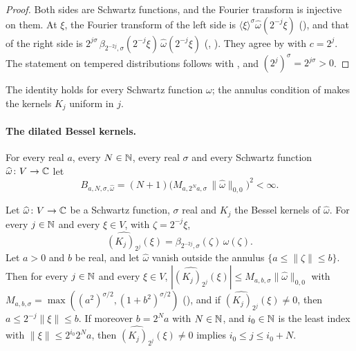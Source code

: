 \begin{proof}
\leanok
Both sides are Schwartz functions, and the Fourier transform is injective on them. At $\xi$,
the Fourier transform of the left side is $\langle \xi \rangle^\sigma \widehat\omega(2^{-j}\xi)$
(), and that of the right side is
$2^{j\sigma} \, \beta_{2^{-2j},\sigma}(2^{-j} \xi) \, \widehat\omega(2^{-j} \xi)$
(, ). They agree by
 with $c = 2^j$. The statement on tempered distributions follows
with , and $(2^j)^\sigma = 2^{j\sigma} > 0$.
\end{proof}

The identity holds for every Schwartz function $\omega$; the annulus condition of
 makes the kernels $K_j$ uniform in $j$.

\paragraph{The dilated Bessel kernels.}

\begin{definition}
\label{def:bessel-overlap}
\leanok
{}
For every real $a$, every $N \in \mathbb{N}$, every real $\sigma$ and every Schwartz function
$\widehat\omega \colon V \to \mathbb{C}$ let
\[
  B_{a,N,\sigma,\widehat\omega} = (N + 1) \bigl( M_{a, 2^N a, \sigma} \,
  \|\widehat\omega\|_{0,0} \bigr)^2 < \infty .
\]
\end{definition}

\begin{lemma}
\label{lem:bessel-kernel-frequency}
\leanok
{}
Let $\widehat\omega \colon V \to \mathbb{C}$ be a Schwartz function, $\sigma$ real and $K_j$ the Bessel
kernels of $\widehat\omega$. For every $j \in \mathbb{N}$ and every $\xi \in V$, with
$\zeta = 2^{-j} \xi$,
\[
  \widehat{(K_j)_{2^j}}(\xi) = \beta_{2^{-2j},\sigma}(\zeta) \, \widehat\omega(\zeta) .
\]
Let $a > 0$ and $b$ be real, and let $\widehat\omega$ vanish outside the annulus
$\{a \leq \|\zeta\| \leq b\}$. Then for every $j \in \mathbb{N}$ and every $\xi \in V$,
$|\widehat{(K_j)_{2^j}}(\xi)| \leq M_{a,b,\sigma} \|\widehat\omega\|_{0,0}$ with
$M_{a,b,\sigma} = \max((a^2)^{\sigma/2}, (1 + b^2)^{\sigma/2})$
(), and if
$\widehat{(K_j)_{2^j}}(\xi) \neq 0$, then $a \leq 2^{-j} \|\xi\| \leq b$. If moreover
$b = 2^N a$ with $N \in \mathbb{N}$, and $i_0 \in \mathbb{N}$ is the least index with
$\|\xi\| \leq 2^{i_0} 2^N a$, then $\widehat{(K_j)_{2^j}}(\xi) \neq 0$ implies
$i_0 \leq j \leq i_0 + N$.
\end{lemma}


